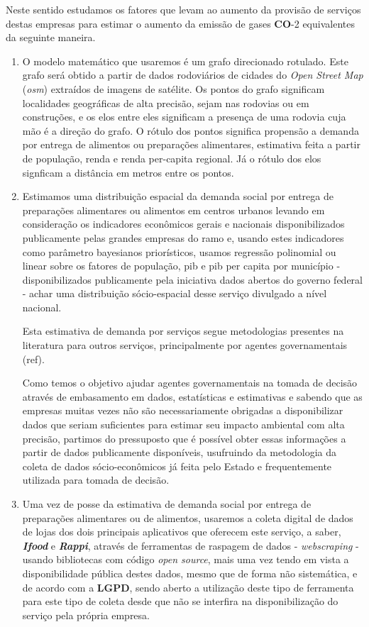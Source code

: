 \documentclass[14pt,a4paper]{article}
\begin{document}
	Neste sentido estudamos os fatores que levam ao aumento da provisão de serviços destas empresas para estimar o aumento da emissão de gases \textbf{CO}-2 equivalentes da seguinte maneira.


	\begin{enumerate}
		\item O modelo matemático que usaremos é um grafo direcionado rotulado. Este grafo será obtido a partir de dados rodoviários de cidades do \textit{Open Street Map} (\textit{osm}) extraídos de imagens de satélite. Os pontos do grafo significam localidades geográficas de alta precisão, sejam nas rodovias ou em construções, e os elos entre eles significam a presença de uma rodovia cuja mão é a direção do grafo. O rótulo dos pontos significa propensão a demanda por entrega de alimentos ou preparações alimentares, estimativa feita a partir de população, renda e renda per-capita regional. Já o rótulo dos elos signficam a distância em metros entre os pontos. 
		
		\item Estimamos uma distribuição espacial da demanda social por entrega de preparações alimentares ou alimentos em centros urbanos levando em consideração os indicadores econômicos gerais e nacionais disponibilizados publicamente pelas grandes empresas do ramo e, usando estes indicadores como parâmetro bayesianos priorísticos, usamos regressão polinomial ou linear sobre os fatores de população, pib e pib per capita por município - disponibilizados publicamente pela iniciativa dados abertos do governo federal - achar uma distribuição sócio-espacial desse serviço divulgado a nível nacional.
		
		Esta estimativa de demanda por serviços segue metodologias presentes na literatura para outros serviços, principalmente por agentes governamentais (ref). 
		
		Como temos o objetivo ajudar agentes governamentais na tomada de decisão através de embasamento em dados, estatísticas e estimativas e sabendo que as empresas muitas vezes não são necessariamente obrigadas a disponibilizar dados que seriam suficientes para estimar seu impacto ambiental com alta precisão, partimos do pressuposto que é possível obter essas informações a partir de dados publicamente disponíveis, usufruindo da metodologia da coleta de dados sócio-econômicos já feita pelo Estado e frequentemente utilizada para tomada de decisão. 
		
		\item 	Uma vez de posse da estimativa de demanda social por entrega de preparações alimentares ou de alimentos, usaremos a coleta digital de dados de lojas dos dois principais aplicativos que oferecem este serviço, a saber, \textit{\textbf{Ifood}} e \textit{\textbf{Rappi}}, através de ferramentas de raspagem de dados - \textit{webscraping} - usando bibliotecas com código \textit{open source}, mais uma vez tendo em vista a disponibilidade pública destes dados, mesmo que de forma não sistemática, e de acordo com a \textbf{LGPD}, sendo aberto a utilização deste tipo de ferramenta para este tipo de coleta desde que não se interfira na disponibilização do serviço pela própria empresa.
		

\end{enumerate}
\end{document}
